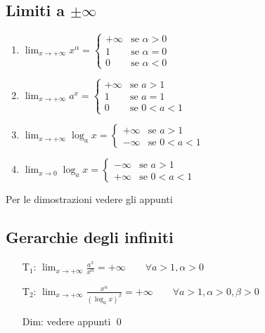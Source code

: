 \documentclass[a4paper]{article}
\begin{document}
\subsection{Limiti a \(\pm \infty\)}
\begin{enumerate}
	\item \(\displaystyle \lim_{x \to + \infty} x ^ \alpha =
	\begin{cases}
		+ \infty & \text{se } \alpha > 0 \\
		1 & \text{se } \alpha = 0 \\
		0 & \text{se } \alpha < 0
	\end{cases}\)
	\item \(\displaystyle \lim_{x \to + \infty} a ^ x =
	\begin{cases}
		+ \infty & \text{se } a > 1 \\
		1 & \text{se } a = 1 \\
		0 & \text{se } 0 < a < 1
	\end{cases}\)
	\item \(\displaystyle \lim_{x \to + \infty} \log_a x =
	\begin{cases}
		+ \infty & \text{se } a > 1 \\
		- \infty & \text{se } 0 < a < 1
	\end{cases}\)
	\item \(\displaystyle \lim_{x \to 0} \log_a x =
	\begin{cases}
		- \infty & \text{se } a > 1 \\
		+ \infty & \text{se } 0 < a < 1
	\end{cases}\)
\end{enumerate}
Per le dimostrazioni vedere gli appunti

\subsection{Gerarchie degli infiniti}
\begin{itemize}
	\item[T\(_1\):] \(\displaystyle \lim_{x \to + \infty} \frac{a^x}{x^\alpha} = + \infty \qquad \forall a > 1, \alpha > 0\)
	\item[T\(_2\):] \(\displaystyle \lim_{x \to + \infty} \frac{x^\alpha}{\left( \log_a x \right) ^ \beta} = + \infty \qquad \forall a > 1, \alpha > 0, \beta > 0\)
	\item[Dim:] vedere appunti \qed
\end{itemize}

\newpage
\end{document}
